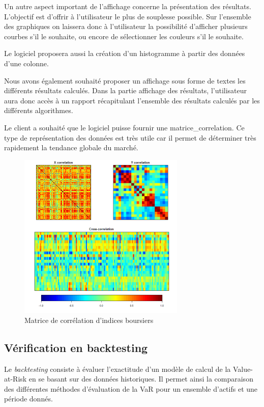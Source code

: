 		Un autre aspect important de l'affichage concerne la présentation des résultats. L'objectif est d'offrir à l'utilisateur le plus de souplesse possible. Sur l'ensemble des graphiques on laissera donc à l'utilisateur la possibilité d'afficher plusieurs courbes s'il le souhaite, ou encore de sélectionner les couleurs s'il le souhaite.

		Le logiciel proposera aussi la création d'un histogramme à partir des données d'une colonne.

		Nous avons également souhaité proposer un affichage sous forme de textes les différents résultats calculés. Dans la partie affichage des résultats, l'utilisateur aura donc accès à un rapport récapitulant l'ensemble des résultats calculés par les différents algorithmes.

		Le client a souhaité que le logiciel puisse fournir une \gls{matrice_correlation}. Ce type de représentation des données est très utile car il permet de déterminer très rapidement la tendance globale du marché.

		\begin{figure}[h]
			\center
			\includegraphics[width=300px]{matrice.png}
			\caption{Matrice de corrélation d'indices boursiers}
		\end{figure}


	\subsection{Vérification en backtesting}
		Le \textit{backtesting} consiste à évaluer l'exactitude d'un modèle de calcul de la Value-at-Risk en se basant sur des données historiques. Il permet ainsi la comparaison des différentes méthodes d'évaluation de la VaR pour un ensemble d'actifs et une période donnés.

